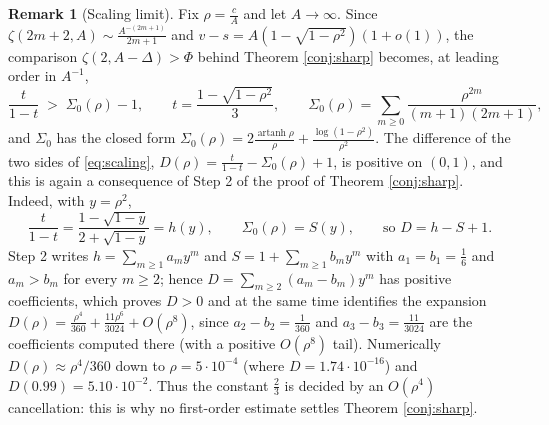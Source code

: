 \documentclass[11pt,a4paper]{amsart}
\theoremstyle{definition}
\newtheorem{remark}[theorem]{Remark}
\DeclareMathOperator{\arsh}{artanh}
\begin{document}
\begin{remark}[Scaling limit]\label{rem:scaling}
Fix $\rho=\frac{c}{A}$ and let $A\to\infty$. Since $\zeta(2m+2,A)\sim\frac{A^{-(2m+1)}}{2m+1}$
and $v-s=A(1-\sqrt{1-\rho^{2}})(1+o(1))$, the comparison $\zeta(2,A-\Delta)>\Phi$ behind
Theorem \ref{conj:sharp} becomes, at leading order in $A^{-1}$,
\begin{equation}\label{eq:scaling}
  \frac{t}{1-t}\;>\;\Sigma_{0}(\rho)-1,
  \qquad t=\frac{1-\sqrt{1-\rho^{2}}}{3},
  \qquad \Sigma_{0}(\rho)=\sum_{m\ge0}\frac{\rho^{2m}}{(m+1)(2m+1)} ,
\end{equation}
and $\Sigma_{0}$ has the closed form
$\Sigma_{0}(\rho)=2\frac{\arsh\rho}{\rho}+\frac{\log(1-\rho^{2})}{\rho^{2}}$. The difference
of the two sides of \eqref{eq:scaling},
$D(\rho)=\frac{t}{1-t}-\Sigma_{0}(\rho)+1$, is positive on $(0,1)$, and this is again a
consequence of Step 2 of the proof of Theorem \ref{conj:sharp}. Indeed, with $y=\rho^{2}$,
\[
  \frac{t}{1-t}=\frac{1-\sqrt{1-y}}{2+\sqrt{1-y}}=h(y),
  \qquad \Sigma_{0}(\rho)=S(y),
  \qquad\text{so } D=h-S+1 .
\]
Step 2 writes $h=\sum_{m\ge1}a_{m}y^{m}$ and $S=1+\sum_{m\ge1}b_{m}y^{m}$ with
$a_{1}=b_{1}=\frac16$ and $a_{m}>b_{m}$ for every $m\ge2$; hence
$D=\sum_{m\ge2}(a_{m}-b_{m})y^{m}$ has positive coefficients, which proves $D>0$ and at the
same time identifies the expansion
$D(\rho)=\frac{\rho^{4}}{360}+\frac{11\rho^{6}}{3024}+O(\rho^{8})$, since $a_2-b_2=\frac1{360}$
and $a_3-b_3=\frac{11}{3024}$ are the coefficients computed there (with a positive
$O(\rho^{8})$ tail). Numerically $D(\rho)\approx\rho^{4}/360$ down to $\rho=5\cdot10^{-4}$
(where $D=1.74\cdot10^{-16}$) and $D(0.99)=5.10\cdot10^{-2}$. Thus the constant $\frac23$ is
decided by an $O(\rho^{4})$ cancellation: this is why no first-order estimate settles
Theorem \ref{conj:sharp}.
\end{remark}
\end{document}
